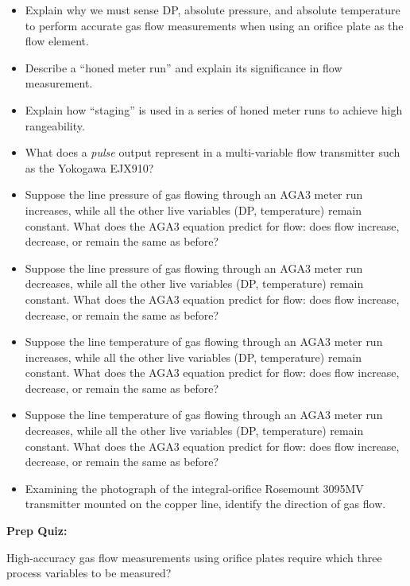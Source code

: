 \begin{itemize}
\item{} Explain why we must sense DP, absolute pressure, and absolute temperature to perform accurate gas flow measurements when using an orifice plate as the flow element.
\item{} Describe a ``honed meter run'' and explain its significance in flow measurement.
\item{} Explain how ``staging'' is used in a series of honed meter runs to achieve high rangeability.
\item{} What does a {\it pulse} output represent in a multi-variable flow transmitter such as the Yokogawa EJX910?
\item{} Suppose the line pressure of gas flowing through an AGA3 meter run increases, while all the other live variables (DP, temperature) remain constant.  What does the AGA3 equation predict for flow: does flow increase, decrease, or remain the same as before?
\item{} Suppose the line pressure of gas flowing through an AGA3 meter run decreases, while all the other live variables (DP, temperature) remain constant.  What does the AGA3 equation predict for flow: does flow increase, decrease, or remain the same as before?
\item{} Suppose the line temperature of gas flowing through an AGA3 meter run increases, while all the other live variables (DP, temperature) remain constant.  What does the AGA3 equation predict for flow: does flow increase, decrease, or remain the same as before?
\item{} Suppose the line temperature of gas flowing through an AGA3 meter run decreases, while all the other live variables (DP, temperature) remain constant.  What does the AGA3 equation predict for flow: does flow increase, decrease, or remain the same as before?
\item{} Examining the photograph of the integral-orifice Rosemount 3095MV transmitter mounted on the copper line, identify the direction of gas flow.
\end{itemize}










\vfil \eject

\noindent
{\bf Prep Quiz:}

High-accuracy gas flow measurements using orifice plates require which three process variables to be measured?

